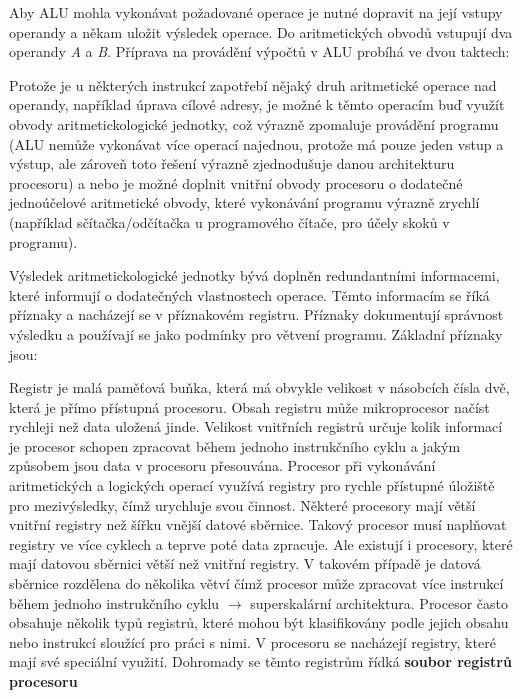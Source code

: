 Aby ALU mohla vykonávat požadované operace je nutné dopravit na její vstupy operandy a někam uložit výsledek operace. Do aritmetických obvodů vstupují dva operandy {\it A} a {\it B}. Příprava na provádění výpočtů v ALU probíhá ve dvou taktech:

\vskip 4mm
\vskip 4mm

Protože je u některých instrukcí zapotřebí nějaký druh aritmetické operace nad operandy, například úprava cílové adresy, je možné k těmto operacím buď využít obvody aritmetickologické jednotky, což výrazně zpomaluje provádění programu (ALU nemůže vykonávat více operací najednou, protože má pouze jeden vstup a výstup, ale zároveň toto řešení výrazně zjednodušuje danou architekturu procesoru) a nebo je možné doplnit vnitřní obvody procesoru o dodatečné jednoúčelové aritmetické obvody, které vykonávání programu výrazně zrychlí (například sčítač\-ka/odčí\-tačka u programového čítače, pro účely skoků v programu). 

Výsledek aritmetickologické jednotky bývá doplněn redundantními informacemi, které informují o dodatečných vlastnostech operace. Těmto informacím se říká příznaky a nacházejí se v příznakovém registru. Příznaky dokumentují správnost výsledku a používají se jako podmínky pro větvení programu. Základní příznaky jsou:

\vskip 4mm
\vskip 4mm


Registr je malá paměťová buňka, která má obvykle velikost v násobcích čísla dvě, která je přímo přístupná procesoru. Obsah registru může mikroprocesor načíst rychleji než data uložená jinde. Velikost vnitřních registrů určuje kolik informací je procesor schopen zpracovat během jednoho instrukčního cyklu a jakým způsobem jsou data v procesoru přesouvána. Procesor při vykonávání aritmetických a logických operací využívá registry pro rychle přístupné úložiště pro mezivýsledky, čímž urychluje svou činnost. Některé procesory mají větší vnitřní registry než šířku vnější datové sběrnice. Takový procesor musí naplňovat registry ve více cyklech a teprve poté data zpracuje. Ale existují i procesory, které mají datovou sběrnici větší než vnitřní registry. V takovém případě je datová sběrnice rozdělena do několika větví čímž procesor může zpracovat více instrukcí během jednoho instrukčního cyklu $\rightarrow$ superskalární architektura. Procesor často obsahuje několik typů registrů, které mohou být klasifikovány podle jejich obsahu nebo instrukcí sloužící pro práci s nimi. V procesoru se nacházejí registry, které mají své speciální využití. Dohromady se těmto registrům řídká {\bf soubor registrů procesoru}

